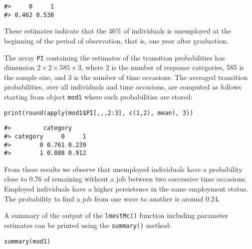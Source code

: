 \begin{verbatim}
#>     0     1 
#> 0.462 0.538
\end{verbatim}

\noindent These estimates indicate that the 46\% of individuals is
unemployed at the beginning of the period of observation, that is, one
year after graduation.

The array \texttt{PI} containing the estimates of the transition probabilities
has dimension \(2 \times 2 \times 585 \times 3\), where 2 is the number of
response categories, 585 is the sample size, and 3 is the number of time
occasions. The averaged transition probabilities, over all individuals
and time occasions, are computed as follows starting from object \texttt{mod1}
where such probabilities are stored:

\begin{verbatim}
print(round(apply(mod1$PI[,,,2:3], c(1,2), mean), 3))
\end{verbatim}

\begin{verbatim}
#>         category
#> category     0     1
#>        0 0.761 0.239
#>        1 0.088 0.912
\end{verbatim}

\noindent From these results we observe that unemployed individuals have
a probability close to 0.76 of remaining without a job between two
successive time occasions. Employed individuals have a higher
persistence in the same employment status. The probability to find a job
from one wave to another is around 0.24.

A summary of the output of the \texttt{lmestMc()} function including parameter
estimates can be printed using the \texttt{summary()} method:

\begin{verbatim}
summary(mod1)
\end{verbatim}

